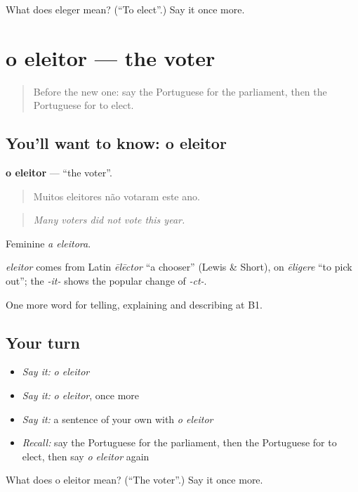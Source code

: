 \begin{tcolorbox}[breakable,colback=teal!4,colframe=teal!35!black,title={Before you move on}]
What does eleger mean? (\textquotedblleft{}To elect\textquotedblright{}.) Say it once more.
\end{tcolorbox}
\section[o eleitor]{o eleitor — the voter}

\label{lesson:PT-C380-eleitor}



\begin{quote}
Before the new one: say the Portuguese for the parliament, then the Portuguese for to elect.
\end{quote}

\subsection*{You'll want to know: o eleitor}
\textbf{o eleitor} — \textquotedblleft{}the voter\textquotedblright{}.

\begin{quote}
Muitos eleitores não votaram este ano.
\end{quote}

\begin{quote}
\emph{Many voters did not vote this year.}
\end{quote}

Feminine \emph{a eleitora}.

\begin{cousinweb}
\emph{eleitor} comes from Latin \emph{ēlēctor} \textquotedblleft{}a chooser\textquotedblright{} (Lewis \& Short), on \emph{ēligere} \textquotedblleft{}to pick out\textquotedblright{}; the \emph{-it-} shows the popular change of \emph{-ct-}.
\end{cousinweb}

\begin{grammarlens}[title={What you've built}]
One more word for telling, explaining and describing at B1.
\end{grammarlens}

\subsection*{Your turn}
\begin{itemize}
\raggedright
  \item \emph{Say it:} \emph{o eleitor}
  \item \emph{Say it:} \emph{o eleitor}, once more
  \item \emph{Say it:} a sentence of your own with \emph{o eleitor}
  \item \emph{Recall:} say the Portuguese for the parliament, then the Portuguese for to elect, then say \emph{o eleitor} again
\end{itemize}

\begin{tcolorbox}[breakable,colback=teal!4,colframe=teal!35!black,title={Before you move on}]
What does o eleitor mean? (\textquotedblleft{}The voter\textquotedblright{}.) Say it once more.
\end{tcolorbox}
